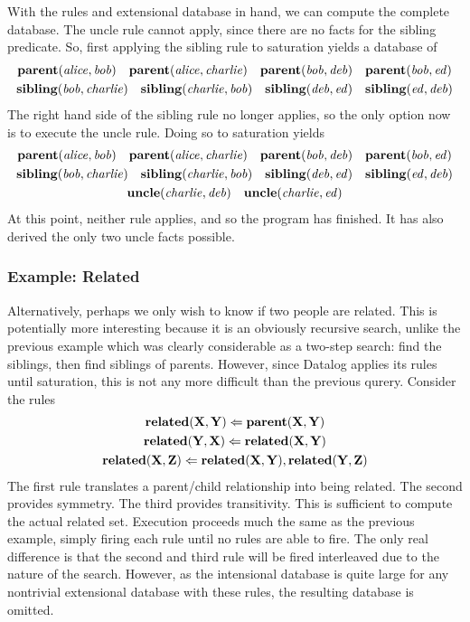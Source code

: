 With the rules and extensional database in hand, we can compute the complete database.
The uncle rule cannot apply, since there are no facts for the sibling predicate.
So, first applying the sibling rule to saturation yields a database of
\begin{gather*}
        {\bf parent}({\it alice}, {\it bob})
        \quad {\bf parent}({\it alice}, {\it charlie})
        \quad {\bf parent}({\it bob}, {\it deb})
        \quad {\bf parent}({\it bob}, {\it ed})\\
        {\bf sibling}({\it bob}, {\it charlie})
        \quad {\bf sibling}({\it charlie}, {\it bob})
        \quad {\bf sibling}({\it deb}, {\it ed})
        \quad {\bf sibling}({\it ed}, {\it deb})
\end{gather*}
The right hand side of the sibling rule no longer applies, so the only option now is to execute the uncle rule.
Doing so to saturation yields
\begin{gather*}
        {\bf parent}({\it alice}, {\it bob})
        \quad {\bf parent}({\it alice}, {\it charlie})
        \quad {\bf parent}({\it bob}, {\it deb})
        \quad {\bf parent}({\it bob}, {\it ed})\\
        {\bf sibling}({\it bob}, {\it charlie})
        \quad {\bf sibling}({\it charlie}, {\it bob})
        \quad {\bf sibling}({\it deb}, {\it ed})
        \quad {\bf sibling}({\it ed}, {\it deb})\\
        {\bf uncle}({\it charlie}, {\it deb})
        \quad {\bf uncle}({\it charlie}, {\it ed})
\end{gather*}
At this point, neither rule applies, and so the program has finished.
It has also derived the only two uncle facts possible.
\subsubsection{Example: Related}
Alternatively, perhaps we only wish to know if two people are related.
This is potentially more interesting because it is an obviously recursive search, unlike the previous example which was clearly considerable as a two-step search: find the siblings, then find siblings of parents.
However, since Datalog applies its rules until saturation, this is not any more difficult than the previous qurery.
Consider the rules
\begin{gather*}
        {\bf related}({\bf X}, {\bf Y}) \Leftarrow {\bf parent}({\bf X}, {\bf Y})\\
        {\bf related}({\bf Y}, {\bf X}) \Leftarrow {\bf related}({\bf X}, {\bf Y})\\
        {\bf related}({\bf X}, {\bf Z}) \Leftarrow {\bf related}({\bf X}, {\bf Y}), {\bf related}({\bf Y}, {\bf Z})
\end{gather*}
The first rule translates a parent/child relationship into being related.
The second provides symmetry.
The third provides transitivity.
This is sufficient to compute the actual related set.
Execution proceeds much the same as the previous example, simply firing each rule until no rules are able to fire.
The only real difference is that the second and third rule will be fired interleaved due to the nature of the search.
However, as the intensional database is quite large for any nontrivial extensional database with these rules, the resulting database is omitted.
